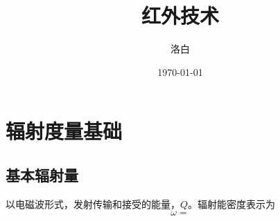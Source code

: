 \documentclass[twocolumn]{ctexart}
\title{红外技术}
\author{洛白}
\date{\today}
\begin{document}
\maketitle
\newpage

\renewcommand{\baselinestretch}{1.35}
\tableofcontents
\newpage

\setlength{\parskip}{0em}
\renewcommand{\baselinestretch}{1.53}


\section{辐射度量基础}
\subsection{基本辐射量}
\begin{description}[leftmargin=1.7cm,style=nextline,nosep]%
    \item[辐射能] 以电磁波形式，发射传输和接受的能量，$Q$。辐射能密度表示为
    \begin{equation}
    \omega= \tag{1.1.1}
    \end{equation} 
\end{description}
\end{document}
